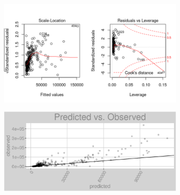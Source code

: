 \begin{figure}[h]
\centering
\begin{subfigure}{1\textwidth}
\centering
\includegraphics[width=.99\textwidth, height=0.475\textheight]{Images/district_heat_rf_res_2.png}
\end{subfigure}
\begin{subfigure}{1\textwidth}
\centering
\includegraphics[width=.99\textwidth, height=0.3\textheight]{Images/district_heat_rf_pvo.png}
\end{subfigure}
\end{figure}
\FloatBarrier
\newpage
